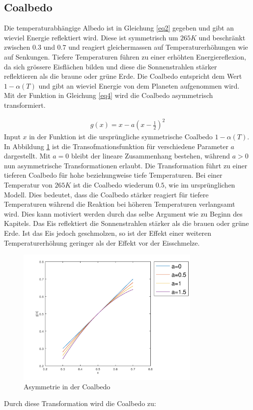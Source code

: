 \begin{refsection}
\subsection{Coalbedo} \label{sec:co} 
Die temperaturabhängige Albedo ist in Gleichung \eqref{eq2} gegeben und gibt an wieviel Energie reflektiert wird. Diese ist symmetrisch um $265 K$ und beschränkt zwischen $0.3$ und $0.7$ und reagiert gleichermassen auf Temperaturerhöhungen wie auf Senkungen. Tiefere Temperaturen führen zu einer erhöhten Energiereflexion, da sich grössere Eisflächen bilden und diese die Sonnenstrahlen stärker reflektieren als die braune oder grüne Erde. Die Coalbedo entspricht dem Wert $1-\alpha(T)$ und gibt an wieviel Energie von dem Planeten aufgenommen wird. Mit der Funktion in Gleichung \ref{eq4} wird die Coalbedo asymmetrisch transformiert. 

\begin{eqnarray} \label{eq4}
g(x)=x-a(x-\frac{1}{2})^2
\end{eqnarray}
Input $x$ in der Funktion ist die ursprüngliche symmetrische Coalbedo $1-\alpha(T)$. In Abbildung \ref{fig:abb10} ist die Transofmationsfunktion für verschiedene Parameter $a$ dargestellt. Mit $a=0$ bleibt der lineare Zusammenhang bestehen, während $a>0$ nun asymmetrische Transformationen erlaubt. Die Transformation führt zu einer tieferen Coalbedo für hohe beziehungweise tiefe Temperaturen. Bei einer Temperatur von $265 K$ ist die Coalbedo wiederum $0.5$, wie im ursprünglichen Modell. Dies bedeutet, dass die Coalbedo stärker reagiert für tiefere Temperaturen während die Reaktion bei höheren Temperaturen verlangsamt wird. Dies kann motiviert werden durch das selbe Argument wie zu Beginn des Kapitels. Das Eis reflektiert die Sonnenstrahlen stärker als die brauen oder grüne Erde. Ist das Eis jedoch geschmolzen, so ist der Effekt einer weiteren Temperaturerhöhung geringer als der Effekt vor der Eisschmelze. 
%
\begin{figure}
	\centering
	\includegraphics[width= 0.8\textwidth]{neigung/Funktion.png}
	\caption[Asymmetrie in der Coalbedo]{Asymmetrie in der Coalbedo}
	\label{fig:abb10}
\end{figure}
%
Durch diese Transformation wird die Coalbedo zu:


\end{refsection}
